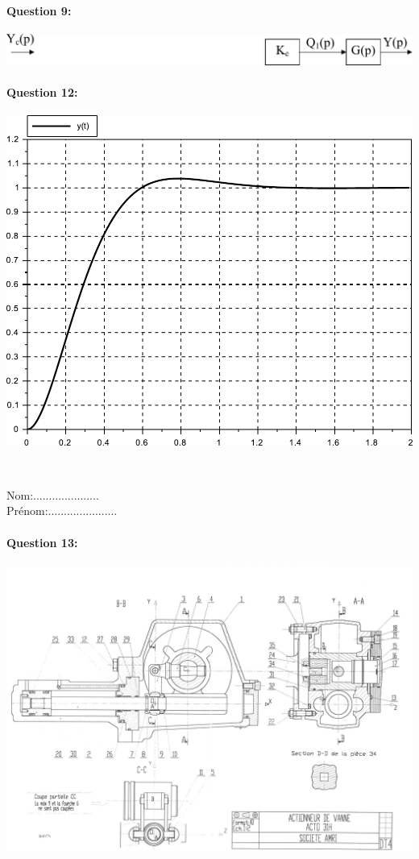 \paragraph{Question 9:}

\begin{center}
 \includegraphics[width=0.8\linewidth]{img/SB2}
\end{center}

\vspace{1cm}
\fi

\paragraph{Question 12:}

\begin{center}
 \includegraphics[width=0.7\linewidth]{img/courbe}
\end{center}


~\

\cleardoublepage

Nom:.....................\\
Prénom:......................

\paragraph{Question 13:}

\begin{center}
 \includegraphics[width=1.3\linewidth,angle=-90]{img/Actionneur_vanne}
\end{center}


